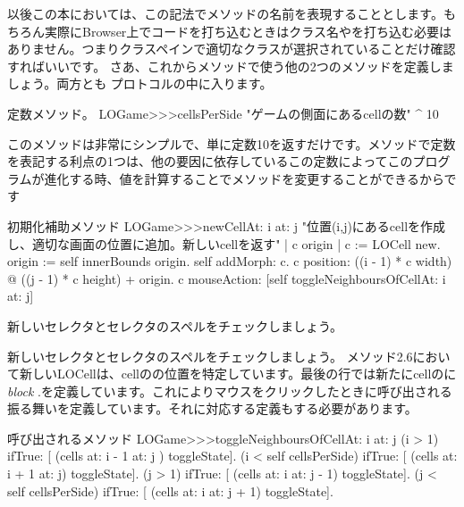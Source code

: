 \documentclass[a4paper,10pt,twoside]{book}
\begin{document}
以後この本においては、この記法でメソッドの名前を表現することとします。もちろん実際にBrowser上でコードを打ち込むときはクラス名や\ct{>>>}を打ち込む必要はありません。つまりクラスペインで適切なクラスが選択されていることだけ確認すればいいです。
さあ、これからメソッドで使う他の2つのメソッドを定義しましょう。両方とも プロトコルの中に入ります。
\begin{method}[sbegamecellsperside]{定数メソッド。}
LOGame>>>cellsPerSide
   "ゲームの側面にあるcellの数"
   ^ 10
\end{method}

このメソッドは非常にシンプルで、単に定数10を返すだけです。メソッドで定数を表記する利点の1つは、他の要因に依存しているこの定数によってこのプログラムが進化する時、値を計算することでメソッドを変更することができるからです

\begin{method}[newCellAt:at:]{初期化補助メソッド}
LOGame>>>newCellAt: i at: j
   "位置(i,j)にあるcellを作成し、適切な画面の位置に追加。新しいcellを返す"
   | c origin |
   c := LOCell new.
   origin := self innerBounds origin.
   self addMorph: c.
   c position: ((i - 1) * c width) @ ((j - 1) * c height) + origin.
   c mouseAction: [self toggleNeighboursOfCellAt: i at: j]
\end{method}

新しいセレクタとセレクタのスペルをチェックしましょう。

 新しいセレクタとセレクタのスペルをチェックしましょう。
メソッド2.6において新しいLOCellは、cellのの位置を特定しています。最後の行では新たにcellのに\emph{block}
\mbox{.}を定義しています。これによりマウスをクリックしたときに呼び出される振る舞いを定義しています。それに対応する定義もする必要があります。

\begin{method}[toggleNeighboursOfCellAt:at:]{呼び出されるメソッド}
LOGame>>>toggleNeighboursOfCellAt: i at: j
   (i > 1) ifTrue: [ (cells at: i - 1 at: j ) toggleState].
   (i < self cellsPerSide) ifTrue: [ (cells at: i + 1 at: j) toggleState].
   (j > 1) ifTrue: [ (cells at: i  at: j - 1) toggleState].
   (j < self cellsPerSide) ifTrue: [ (cells at: i at: j + 1) toggleState].
\end{method}
\end{document}
